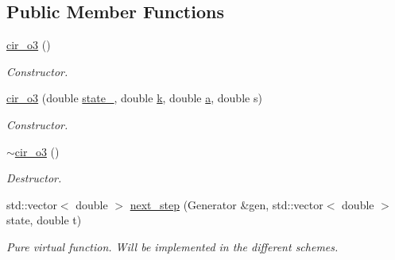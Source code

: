 \subsection*{Public Member Functions}
\begin{DoxyCompactItemize}
\item 
\mbox{\label{classcir__o3_a73106636672bfd0236b2272e480a521c}} 
\mbox{\hyperlink{classcir__o3_a73106636672bfd0236b2272e480a521c}{cir\+\_\+o3}} ()
\begin{DoxyCompactList}\small\item\em Constructor. \end{DoxyCompactList}\item 
\mbox{\label{classcir__o3_adda0ca25019f56ef8987af11c1b6a9ad}} 
\mbox{\hyperlink{classcir__o3_adda0ca25019f56ef8987af11c1b6a9ad}{cir\+\_\+o3}} (double \mbox{\hyperlink{classprocess_ab4d01c8ea2e9c8285134786d32ae42aa}{state\+\_}}, double \mbox{\hyperlink{classcir_aa5b05ff03ee8bb587ea94426a9ce704b}{k}}, double \mbox{\hyperlink{classcir_a358578305ea60d31c00546233304651c}{a}}, double s)
\begin{DoxyCompactList}\small\item\em Constructor. \end{DoxyCompactList}\item 
\mbox{\label{classcir__o3_a8d51e7530a1170a835b548b601746537}} 
\mbox{\hyperlink{classcir__o3_a8d51e7530a1170a835b548b601746537}{$\sim$cir\+\_\+o3}} ()
\begin{DoxyCompactList}\small\item\em Destructor. \end{DoxyCompactList}\item 
\mbox{\label{classcir__o3_a77d0f79c0634f1d6cd19017e56eab451}} 
std\+::vector$<$ double $>$ \mbox{\hyperlink{classcir__o3_a77d0f79c0634f1d6cd19017e56eab451}{next\+\_\+step}} (Generator \&gen, std\+::vector$<$ double $>$ state, double t)
\begin{DoxyCompactList}\small\item\em Pure virtual function. Will be implemented in the different schemes. \end{DoxyCompactList}\end{DoxyCompactItemize}
